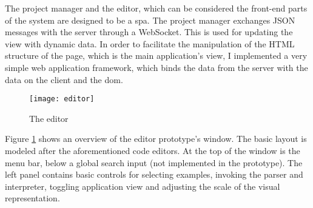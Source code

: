The project manager and the editor, which can be considered the front-end parts
of the system are designed to be a
\acrlong{spa}\cite{spa_wikipedia}. The
project manager exchanges JSON messages with the server through a
WebSocket. This is used for updating the view with dynamic data. In order to
facilitate the manipulation of the HTML structure of the page, which is the main
application's view, I implemented a very simple web application framework, which
binds the data from the server with the data on the client and the
\acrlong{dom}\cite[Chapter~13]{eloquentjs}.

\begin{figure}[h!]
\centering \texttt{[image: editor]}
\caption{The editor}
\label{fig:editor}
\end{figure}

Figure \ref{fig:editor} shows an overview of the editor prototype's window. The
basic layout is modeled after the aforementioned code editors. At the top of the
window is the menu bar, below a global search input (not implemented in the
prototype). The left panel contains basic controls for selecting examples,
invoking the parser and interpreter, toggling application view and adjusting the
scale of the visual representation.

